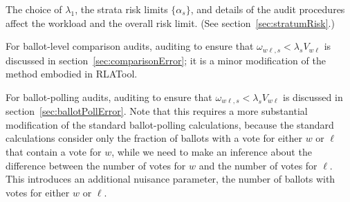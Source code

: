 \documentclass[12pt]{article}
\begin{document}
The choice of $\lambda_1$, the strata risk limits $\{\alpha_s\}$, and details of the
audit procedures affect the workload and the overall risk limit.
(See section~\ref{sec:stratumRisk}.)

For ballot-level comparison audits, auditing to ensure that $\omega_{w\ell,s} < \lambda_s V_{w\ell}$
is discussed in section~\ref{sec:comparisonError}; it is a minor modification of the method
embodied in RLATool.

For ballot-polling audits, auditing to ensure that $\omega_{w\ell,s} < \lambda_s V_{w\ell}$ is discussed in section~\ref{sec:ballotPollError}.
Note that this requires a more substantial modification of the standard ballot-polling calculations,
because the standard calculations consider only the fraction of ballots with a vote for either 
$w$ or $\ell$ that contain a vote for $w$, while we need to make an inference about the 
difference between the number of votes for $w$ and the number of votes for $\ell$.
This introduces an additional nuisance parameter, the number of ballots with votes for either
$w$ or $\ell$.









\end{document}
